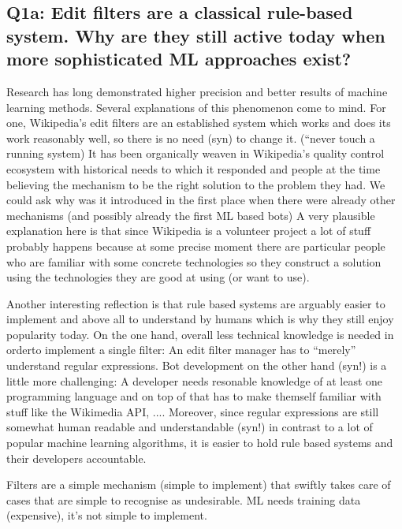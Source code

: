 \subsection{Q1a: Edit filters are a classical rule-based system. Why are they still active today when more sophisticated ML approaches exist?}

Research has long demonstrated higher precision and better results of machine learning methods. %
Several explanations of this phenomenon come to mind.
For one, Wikipedia's edit filters are an established system which works and does its work reasonably well, so there is no need (syn) to change it. (``never touch a running system)
It has been organically weaven in Wikipedia's quality control ecosystem with historical needs to which it responded and people at the time believing the mechanism to be the right solution to the problem they had.
We could ask why was it introduced in the first place when there were already other mechanisms (and possibly already the first ML based bots) %
A very plausible explanation here is that since Wikipedia is a volunteer project a lot of stuff probably happens because at some precise moment there are particular people who are familiar with some concrete technologies so they construct a solution using the technologies they are good at using (or want to use).

Another interesting reflection is that rule based systems are arguably easier to implement and above all to understand by humans which is why they still enjoy popularity today.
On the one hand, overall less technical knowledge is needed in orderto implement a single filter:
An edit filter manager has to ``merely'' understand regular expressions.
Bot development on the other hand (syn!) is a little more challenging:
A developer needs resonable knowledge of at least one programming language and on top of that has to make themself familiar with stuff like the Wikimedia API, ....
Moreover, since regular expressions are still somewhat human readable and understandable (syn!) in contrast to a lot of popular machine learning algorithms, it is easier to hold rule based systems and their developers accountable.

Filters are a simple mechanism (simple to implement) that swiftly takes care of cases that are simple to recognise as undesirable.
ML needs training data (expensive), it's not simple to implement.



